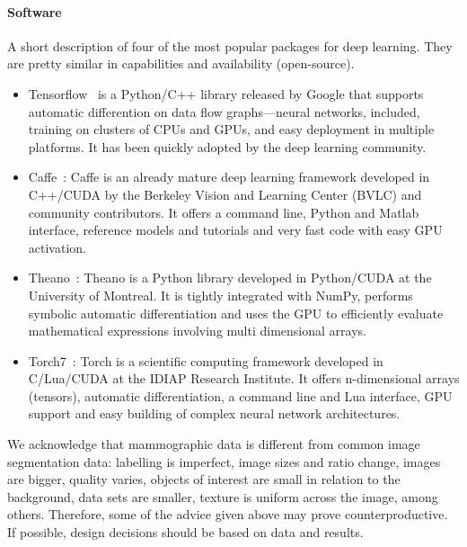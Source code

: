 \paragraph{Software}A short description of four of the most popular packages for deep learning. They are pretty similar in capabilities and availability (open-source).

\begin{itemize}
	\item Tensorflow~\cite{Abadi2015} is a Python/C++ library released by Google that supports automatic differention on data flow graphs---neural networks, included, training on clusters of CPUs and GPUs, and easy deployment in multiple platforms. It has been quickly adopted by the deep learning community.
	\item Caffe~\cite{Jia2014}: Caffe is an already mature deep learning framework developed in C++/CUDA by the Berkeley Vision and Learning Center (BVLC) and community contributors. It offers a command line, Python and Matlab interface, reference models and tutorials and very fast code with easy GPU activation.
	\item Theano~\cite{Bergstra2010, Bastien2012}: Theano is a Python library developed in Python/CUDA at the University of Montreal. It is tightly integrated with NumPy, performs symbolic automatic differentiation and uses the GPU to efficiently evaluate mathematical expressions involving multi dimensional arrays.
	\item Torch7~\cite{Collobert2011}: Torch is a scientific computing framework developed in C/Lua/CUDA at the IDIAP Research Institute. It offers n-dimensional arrays (tensors), automatic differentiation, a command line and Lua interface, GPU support and easy building of complex neural network architectures.
\end{itemize}

\bigskip

We acknowledge that mammographic data is different from common image segmentation data: labelling is imperfect, image sizes and ratio change, images are bigger, quality varies, objects of interest are small in relation to the background, data sets are smaller, texture is uniform across the image, among others. Therefore, some of the advice given above may prove counterproductive. If possible, design decisions should be based on data and results.
